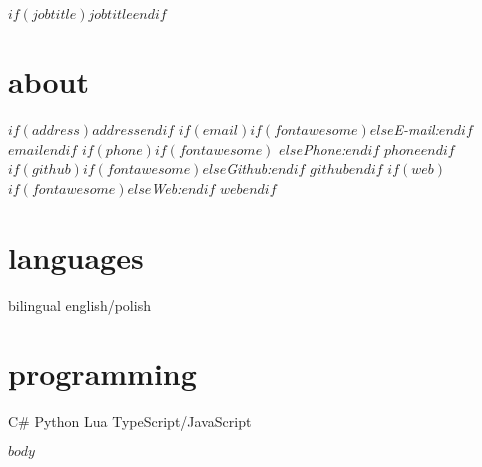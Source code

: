 \documentclass[]{template/friggeri-cv}
\begin{document}
       $if(jobtitle)${$jobtitle$}$endif$

\begin{aside}
  \section{about}
    $if(address)${$address$}$endif$
    $if(email)$$if(fontawesome)$\faEnvelopeO \hspace{1 mm}$else$\emph{E-mail:}$endif$ \href{mailto:}{\tt $email$}$endif$
    $if(phone)$$if(fontawesome)$ \faPhone \hspace{1 mm}$else$\emph{Phone:}$endif$  $phone$$endif$ 
    $if(github)$$if(fontawesome)$\faGithub \hspace{1 mm}$else$\emph{Github:}$endif$ \href{http://github.com/$github$}{\tt $github$}$endif$     $if(web)$$if(fontawesome)$\faGlobe \hspace{1 mm}$else$\emph{Web:}$endif$ \href{http://$web$}{\tt $web$}$endif$
  \section{languages}
    bilingual english/polish
  \section{programming}
    C\#
    Python
    Lua
    TypeScript/JavaScript
\end{aside}

$body$
\end{document}
